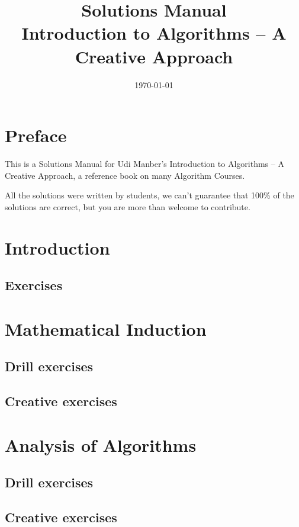 \documentclass[a4paper,11pt]{memoir}
\title{{\huge \textbf{Solutions Manual}}\\Introduction to Algorithms -- A Creative
Approach}
\author{}
\date{\today}
\begin{document}
    \frontmatter

    \maketitle
    \chapter{Preface}
    This is a Solutions Manual for Udi Manber's Introduction to Algorithms -- A
    Creative Approach, a reference book on many Algorithm Courses.

    All the solutions were written by students, we can't guarantee that 100\% of
    the solutions are correct, but you are more than welcome to contribute.

    \newpage
    \tableofcontents

    \mainmatter
    \chapter{Introduction}
    \section*{Exercises}

    \chapter{Mathematical Induction}
    \section*{Drill exercises}
    \section*{Creative exercises}

    \chapter{Analysis of Algorithms}
    \section*{Drill exercises}
    
    \section*{Creative exercises}
\end{document}
